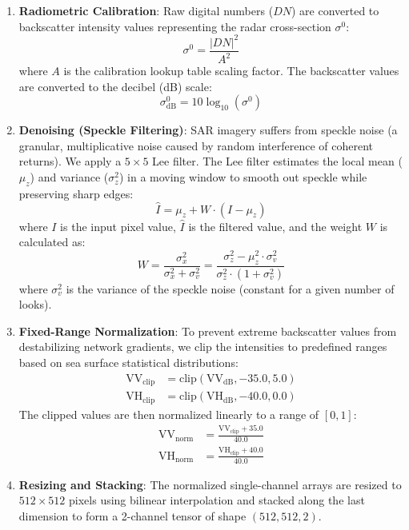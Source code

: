 \documentclass[conference]{IEEEtran}
\begin{document}
\begin{enumerate}
  \item \textbf{Radiometric Calibration}: Raw digital numbers ($DN$) are converted to backscatter intensity values representing the radar cross-section $\sigma^0$:
   \begin{equation}
   \sigma^0 = \frac{|DN|^2}{A^2}
   \end{equation}
   where $A$ is the calibration lookup table scaling factor. The backscatter values are converted to the decibel (dB) scale:
   \begin{equation}
   \sigma^0_{\text{dB}} = 10 \log_{10}(\sigma^0)
   \end{equation}

\item \textbf{Denoising (Speckle Filtering)}: SAR imagery suffers from speckle noise (a granular, multiplicative noise caused by random interference of coherent returns). We apply a $5 \times 5$ Lee filter. The Lee filter estimates the local mean ($\mu_z$) and variance ($\sigma^2_z$) in a moving window to smooth out speckle while preserving sharp edges:
   \begin{equation}
   \hat{I} = \mu_z + W \cdot (I - \mu_z)
   \end{equation}
   where $I$ is the input pixel value, $\hat{I}$ is the filtered value, and the weight $W$ is calculated as:
   \begin{equation}
   W = \frac{\sigma^2_x}{\sigma^2_x + \sigma^2_v} = \frac{\sigma^2_z - \mu^2_z \cdot \sigma^2_v}{\sigma^2_z \cdot (1 + \sigma^2_v)}
   \end{equation}
   where $\sigma^2_v$ is the variance of the speckle noise (constant for a given number of looks).

\item \textbf{Fixed-Range Normalization}: To prevent extreme backscatter values from destabilizing network gradients, we clip the intensities to predefined ranges based on sea surface statistical distributions:
   \begin{align}
   \text{VV}_{\text{clip}} &= \text{clip}(\text{VV}_{\text{dB}}, -35.0, 5.0) \\
   \text{VH}_{\text{clip}} &= \text{clip}(\text{VH}_{\text{dB}}, -40.0, 0.0)
   \end{align}
   The clipped values are then normalized linearly to a range of $[0, 1]$:
   \begin{align}
   \text{VV}_{\text{norm}} &= \frac{\text{VV}_{\text{clip}} + 35.0}{40.0} \\
   \text{VH}_{\text{norm}} &= \frac{\text{VH}_{\text{clip}} + 40.0}{40.0}
   \end{align}

\item \textbf{Resizing and Stacking}: The normalized single-channel arrays are resized to $512 \times 512$ pixels using bilinear interpolation and stacked along the last dimension to form a 2-channel tensor of shape $(512, 512, 2)$.
\end{enumerate}
\end{document}
